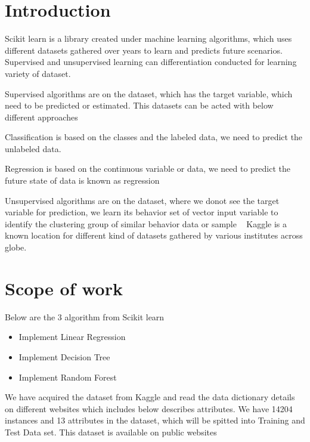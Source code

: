 \section{Introduction}

Scikit learn is a library created under machine learning algorithms, which uses 
different datasets gathered over years to learn and predicts future scenarios. 
Supervised and unsupervised learning can differentiation conducted for learning 
variety of dataset.

Supervised algorithms are on the dataset, which has the target variable, which 
need to be predicted or estimated. This datasets can be acted with below different 
approaches

Classification is based on the classes and the labeled data, we need to predict 
the unlabeled data.

Regression is based on the continuous variable or data, we need to predict the 
future state of data is known as regression

Unsupervised algorithms are on the dataset, where we donot see the target variable 
for prediction, we learn its behavior set of vector input variable to identify the 
clustering group of similar behavior data or sample
~\cite{sckitml}
Kaggle is a known location for different kind of datasets gathered by various 
institutes across globe.

\section{Scope of work}

Below are the 3 algorithm from Scikit learn
\begin{itemize}
\item Implement Linear Regression
\item Implement Decision Tree
\item Implement Random Forest
\end{itemize}

We have acquired the dataset from Kaggle and read the data dictionary details on 
different websites which includes below describes attributes. We have 14204 instances and 13 
attributes in the dataset, which will be spitted into Training and Test Data set. This dataset 
is available on public websites

